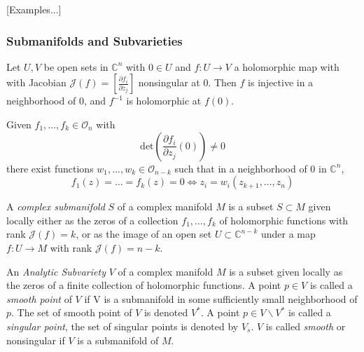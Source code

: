 [Examples...]


\subsubsection{Submanifolds and Subvarieties}


\begin{thm}

	Let $U,V$ be open sets in $ \mathbb{C}^n$ with $0 \in U$ and $ f: U \to V$ a holomorphic map with with Jacobian $ \mathcal{J}(f) = [ \frac{ \partial f_i }{\partial z_j } ]$ nonsingular at 0. Then $f$ is injective in a neighborhood of 0, and $f^{-1}$ is holomorphic at $f(0)$.

\end{thm}


\begin{thm}

Given $f_1, \ldots, f_k \in \mathcal{O}_n$ with 
\[
	\mathrm{det} \left( \frac{ \partial f_i }{\partial z_j }(0)  \right) \neq 0
\]
there exist functions $w_1, \ldots, w_k \in \mathcal{O}_{n-k}$ such that in a neighborhood of 0 in $ \mathbb{C}^n$,
\[
	f_1(z) = \ldots = f_k(z) = 0 \iff z_i = w_i (z_{k+1}, \ldots, z_n)
\]


\end{thm}



\begin{defn}

	A \textit{complex submanifold} $S$ of a complex manifold $M$ is a subset $S \subset M$ given locally either as the zeros of a collection $f_1,\ldots, f_k$ of holomorphic functions with rank $ \mathcal{J}(f) = k$, or as the image of an open set $U \subset \mathbb{C}^{n-k}$ under a map $ f: U \to M$ with rank $ \mathcal{J}(f) = n-k$.

\end{defn}


\begin{defn}

	An \textit{Analytic Subvariety} $V$ of a complex manifold $M$ is a subset given locally as the zeros of a finite collection of holomorphic functions. A point $p \in V$ is called a \textit{smooth point} of $V$ if V is a submanifold in some sufficiently small neighborhood of $p$. The set of smooth point of $V$ is denoted $V^*$. A point $p \in V \backslash V^*$ is called a \textit{singular point}, the set of singular points is denoted by $V_s$. $V$ is called \textit{smooth} or nonsingular if $V$ is a submanifold of $M$.

\end{defn}

